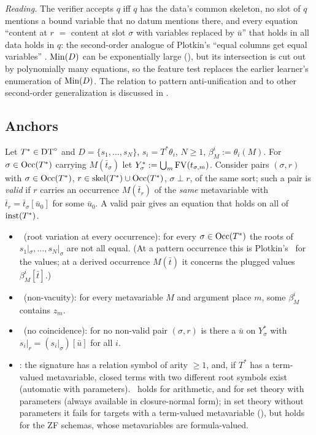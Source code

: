 \noindent\emph{Reading.} The verifier accepts $q$ iff $q$ has the data's common skeleton, no slot of $q$ mentions a bound variable that no datum mentions there, and every equation ``content at $r$ $=$ content at slot $\sigma$ with variables replaced by $\bar u$'' that holds in all data holds in $q$: the second-order analogue of Plotkin's ``equal columns get equal variables'' \citep{plotkin1970note,reynolds1970transformational}. $\mathrm{Min}(D)$ can be exponentially large (), but its intersection is cut out by polynomially many equations, so the feature test replaces the earlier learner's enumeration of $\mathrm{Min}(D)$. The relation to pattern anti-unification and to other second-order generalization is discussed in .

\subsection{Anchors}\label{sec:single:anchor}

Let $T^*\in\mathrm{DT}^{\circ}$ and $D=\{s_1,\dots,s_N\}$, $s_i=T^*\theta_i$, $N\ge1$, $\beta^i_M:=\theta_i(M)$. For $\sigma\in\mathrm{Occ}(T^*)$ carrying $M(\bar t_\sigma)$ let $Y^*_\sigma:=\bigcup_m\mathrm{FV}(t_{\sigma,m})$. Consider pairs $(\sigma,r)$ with $\sigma\in\mathrm{Occ}(T^*)$, $r\in\mathrm{skel}(T^*)\cup\mathrm{Occ}(T^*)$, $\sigma\perp r$, of the same sort; such a pair is \emph{valid} if $r$ carries an occurrence $M(\bar t_r)$ of the \emph{same} metavariable with $\bar t_r=\bar t_\sigma[\bar u_0]$ for some $\bar u_0$. A valid pair gives an equation that holds on all of $\mathrm{inst}(T^*)$.

\begin{definition}\label{def:single:events}
\leavevmode
\begin{itemize}
\item \evRs\ (root variation at every occurrence): for every $\sigma\in\mathrm{Occ}(T^*)$ the roots of $s_1|_\sigma,\dots,s_N|_\sigma$ are not all equal. (At a pattern occurrence this is Plotkin's \evR\ for the values; at a derived occurrence $M(\bar t)$ it concerns the plugged values $\beta^i_M[\bar t]$.)
\item \evN\ (non-vacuity): for every metavariable $M$ and argument place $m$, some $\beta^i_M$ contains $z_m$.
\item \evU\ (no coincidence): for no non-valid pair $(\sigma,r)$ is there a $\bar u$ on $Y^*_\sigma$ with $s_i|_r=(s_i|_\sigma)[\bar u]$ for all $i$.
\item \Rich: the signature has a relation symbol of arity $\ge1$, and, if $T^*$ has a term-valued metavariable, closed terms with two different root symbols exist (automatic with parameters). \Rich\ holds for arithmetic, and for set theory with parameters (always available in closure-normal form); in set theory without parameters it fails for targets with a term-valued metavariable (), but holds for the ZF schemas, whose metavariables are formula-valued.
\end{itemize}
\end{definition}

